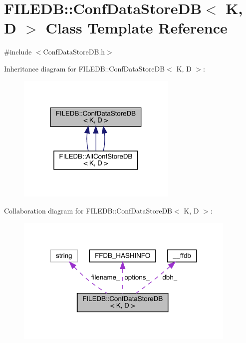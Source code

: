 \hypertarget{classFILEDB_1_1ConfDataStoreDB}{}\section{F\+I\+L\+E\+DB\+:\+:Conf\+Data\+Store\+DB$<$ K, D $>$ Class Template Reference}
\label{classFILEDB_1_1ConfDataStoreDB}


{\ttfamily \#include $<$Conf\+Data\+Store\+D\+B.\+h$>$}



Inheritance diagram for F\+I\+L\+E\+DB\+:\+:Conf\+Data\+Store\+DB$<$ K, D $>$\+:
\nopagebreak
\begin{figure}[H]
\begin{center}
\leavevmode
\includegraphics[width=217pt]{d4/d76/classFILEDB_1_1ConfDataStoreDB__inherit__graph}
\end{center}
\end{figure}


Collaboration diagram for F\+I\+L\+E\+DB\+:\+:Conf\+Data\+Store\+DB$<$ K, D $>$\+:\nopagebreak
\begin{figure}[H]
\begin{center}
\leavevmode
\includegraphics[width=299pt]{d0/d41/classFILEDB_1_1ConfDataStoreDB__coll__graph}
\end{center}
\end{figure}
